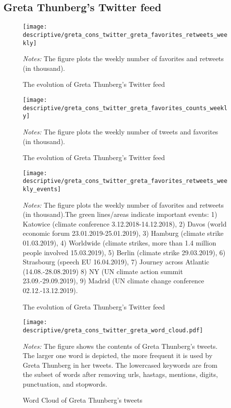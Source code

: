 \documentclass[11pt, a4paper]{article} %
\begin{document}
\subsection{Greta Thunberg's Twitter feed}
\begin{figure}[H]\centering
	\caption{The evolution of Greta Thunberg's Twitter feed}
	\texttt{[image: descriptive/greta\_cons\_twitter\_greta\_favorites\_retweets\_weekly]}
	\begin{minipage}{\linewidth}
		\scriptsize{\emph{Notes:} The figure plots the weekly number of favorites and retweets (in thousand).}
	\end{minipage}
\end{figure}


\begin{figure}[H]\centering
	\caption{The evolution of Greta Thunberg's Twitter feed}
	\texttt{[image: descriptive/greta\_cons\_twitter\_greta\_favorites\_counts\_weekly]}
	\begin{minipage}{\linewidth}
		\scriptsize{\emph{Notes:} The figure plots the weekly number of tweets and favorites (in thousand).}
	\end{minipage}
\end{figure}

\begin{figure}[H]\centering
	\caption{The evolution of Greta Thunberg's Twitter feed}
	\texttt{[image: descriptive/greta\_cons\_twitter\_greta\_favorites\_retweets\_weekly\_events]}
	\begin{minipage}{\linewidth}
		\scriptsize{\emph{Notes:} The figure plots the weekly number of favorites and retweets (in thousand).The green lines/areas indicate important events: 1) Katowice (climate conference 3.12.2018-14.12.2018), 2) Davos (world economic forum 23.01.2019-25.01.2019), 3) Hamburg (climate strike 01.03.2019), 4) Worldwide (climate strikes, more than 1.4 million people involved 15.03.2019), 5) Berlin (climate strike 29.03.2019), 6) Strasbourg (speech EU 16.04.2019), 7) Journey across Atlantic (14.08.-28.08.2019) 8) NY (UN climate action summit 23.09.-29.09.2019), 9) Madrid (UN climate change conference 02.12.-13.12.2019).}
	\end{minipage}
\end{figure}



\newpage
\begin{figure}[H]\centering
	\caption{Word Cloud of Greta Thunberg's tweets}
	\texttt{[image: descriptive/greta\_cons\_twitter\_greta\_word\_cloud.pdf]}
	\begin{minipage}{\linewidth}
		\scriptsize{\emph{Notes:} The figure shows the contents of Greta Thunberg's tweets. The larger one word is depicted, the more frequent it is used by Greta Thunberg in her tweets. The lowercased keywords are from the subset of words after removing urls, hastags, mentions, digits, punctuation, and stopwords.}
	\end{minipage}
\end{figure}
\end{document}
